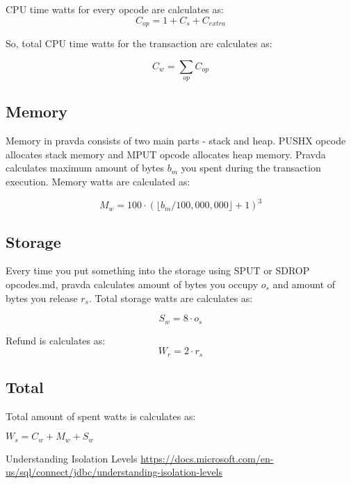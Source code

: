 \documentclass[12pt,a4paper]{article}
\begin{document}
CPU time watts for every opcode are calculates as:
$$ C_{op} = 1 + C_{s} + C_{extra} $$ 


So, total CPU time watts for the transaction are calculates as:

$$ C_w = \sum_{op} C_{op} $$ 

\subsection{Memory}

Memory in pravda consists of two main parts - stack and heap. PUSHX opcode allocates stack memory and MPUT opcode allocates heap memory. Pravda calculates maximum amount of bytes $b_m$ you spent during the transaction execution. Memory watts are calculated as:

$$M_w = 100\cdot(\lfloor b_m/100,000,000 \rfloor + 1)^3 $$

\subsection{Storage}

Every time you put something into the storage using SPUT or SDROP opcodes.md, pravda calculates amount of bytes you occupy $o_s$ and amount of bytes you release $r_s$. Total storage watts are calculates as:

$$S_w = 8 \cdot o_s $$

Refund is calculates as:
$$W_r = 2 \cdot r_s $$

\subsection{Total}

Total amount of spent watts is calculates as:

$W_s = C_w + M_w + S_w$

\begin{thebibliography}{9}

 Understanding Isolation Levels \url{https://docs.microsoft.com/en-us/sql/connect/jdbc/understanding-isolation-levels}
\end{thebibliography}
\end{document}
